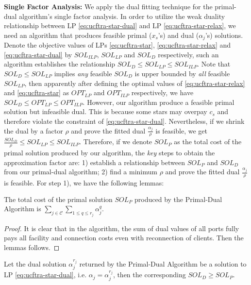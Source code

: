 \documentclass[10pt]{llncs}
\begin{document}
\textbf{Single Factor Analysis: }We apply the dual fitting technique
\cite{Jain03dualfitting} for the primal-dual algorithm's single factor
analysis. In order to utilize the weak duality relationship between
LP \eqref{eq:ucftra-star-dual} and LP \eqref{eq:ucftra-star-relax},
we need an algorithm that produces feasible primal ($x_{s}$'s) and
dual ($\alpha_{j}$'s) solutions. Denote the objective values of LPs
\eqref{eq:ucftra-star}, \eqref{eq:ucftra-star-relax} and \eqref{eq:ucftra-star-dual}
by $SOL_{ILP},\, SOL_{LP}$ and $SOL_{D}$ respectively, such an algorithm
establishes the relationship $SOL_{D}\leq SOL_{LP}\leq SOL_{ILP}$.
Note that $SOL_{D}\leq SOL_{LP}$ implies \textit{any} feasible $SOL_{D}$
is upper bounded by \textit{all} feasible $SOL_{LP}$, then apparently
after defining the optimal values of \eqref{eq:ucftra-star-relax}
and \eqref{eq:ucftra-star} as $OPT_{LP}$ and $OPT_{ILP}$ respectively,
we have $SOL_{D}\leq OPT_{LP}\leq OPT_{ILP}.$ However, our algorithm
produce a feasible primal solution but infeasible dual. This is because
some stars may overpay $c_{s}$ and therefore violate the constraint
of \eqref{eq:ucftra-star-dual}. Nevertheless, if we shrink the dual
by a factor $\rho$ and prove the fitted dual $\frac{\alpha_{j}}{\rho}$
is feasible, we get $\frac{SOL_{D}}{\rho}\leq SOL_{LP}\leq SOL_{ILP}$.
Therefore, if we denote $SOL_{P}$ as the total cost of the primal
solution produced by our algorithm, the \textit{key }steps to obtain
the approximation factor are: 1) establish a relationship between
$SOL_{P}$ and $SOL_{D}$ from our primal-dual algorithm; 2) find
a minimum $\rho$ and prove the fitted dual $\frac{\alpha_{j}}{\rho}$
is feasible. For step 1), we have the following lemmas:
\begin{lemma}
The total cost of the primal solution $SOL_{P}$ produced by the Primal-Dual
Algorithm is $\sum_{j\in\mathcal{C}}\sum_{1\leq q\leq r_{j}}$$\alpha_{j}^{q}$.
\label{lem:1}\end{lemma}
\begin{proof}
It is clear that in the algorithm, the sum of dual values of all ports
fully pays all facility and connection costs even with reconnection
of clients. Then the lemmas follows.\end{proof}
\begin{lemma}
Let the dual solution $\alpha_{j}^{r_{j}}$ returned by the Primal-Dual
Algorithm be a solution to LP \eqref{eq:ucftra-star-dual}, i.e. $\alpha_{j}=\alpha_{j}^{r_{j}}$,
then the corresponding $SOL_{D}\geq SOL_{P}$.\label{lem:p=00003Dd}\end{lemma}
\end{document}

